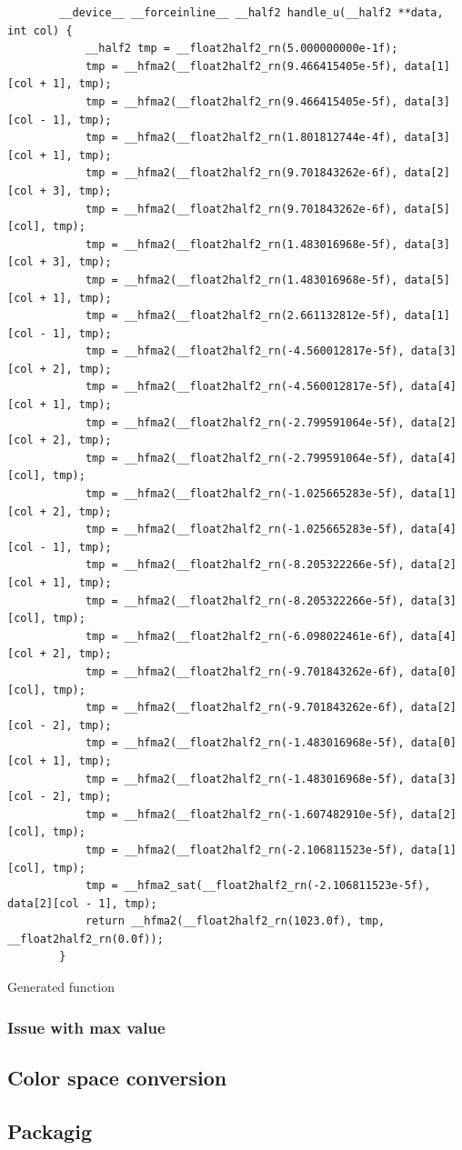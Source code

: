 \begin{listing}[H]
    \begin{verbatim}
        __device__ __forceinline__ __half2 handle_u(__half2 **data, int col) {
            __half2 tmp = __float2half2_rn(5.000000000e-1f);
            tmp = __hfma2(__float2half2_rn(9.466415405e-5f), data[1][col + 1], tmp);
            tmp = __hfma2(__float2half2_rn(9.466415405e-5f), data[3][col - 1], tmp);
            tmp = __hfma2(__float2half2_rn(1.801812744e-4f), data[3][col + 1], tmp);
            tmp = __hfma2(__float2half2_rn(9.701843262e-6f), data[2][col + 3], tmp);
            tmp = __hfma2(__float2half2_rn(9.701843262e-6f), data[5][col], tmp);
            tmp = __hfma2(__float2half2_rn(1.483016968e-5f), data[3][col + 3], tmp);
            tmp = __hfma2(__float2half2_rn(1.483016968e-5f), data[5][col + 1], tmp);
            tmp = __hfma2(__float2half2_rn(2.661132812e-5f), data[1][col - 1], tmp);
            tmp = __hfma2(__float2half2_rn(-4.560012817e-5f), data[3][col + 2], tmp);
            tmp = __hfma2(__float2half2_rn(-4.560012817e-5f), data[4][col + 1], tmp);
            tmp = __hfma2(__float2half2_rn(-2.799591064e-5f), data[2][col + 2], tmp);
            tmp = __hfma2(__float2half2_rn(-2.799591064e-5f), data[4][col], tmp);
            tmp = __hfma2(__float2half2_rn(-1.025665283e-5f), data[1][col + 2], tmp);
            tmp = __hfma2(__float2half2_rn(-1.025665283e-5f), data[4][col - 1], tmp);
            tmp = __hfma2(__float2half2_rn(-8.205322266e-5f), data[2][col + 1], tmp);
            tmp = __hfma2(__float2half2_rn(-8.205322266e-5f), data[3][col], tmp);
            tmp = __hfma2(__float2half2_rn(-6.098022461e-6f), data[4][col + 2], tmp);
            tmp = __hfma2(__float2half2_rn(-9.701843262e-6f), data[0][col], tmp);
            tmp = __hfma2(__float2half2_rn(-9.701843262e-6f), data[2][col - 2], tmp);
            tmp = __hfma2(__float2half2_rn(-1.483016968e-5f), data[0][col + 1], tmp);
            tmp = __hfma2(__float2half2_rn(-1.483016968e-5f), data[3][col - 2], tmp);
            tmp = __hfma2(__float2half2_rn(-1.607482910e-5f), data[2][col], tmp);
            tmp = __hfma2(__float2half2_rn(-2.106811523e-5f), data[1][col], tmp);
            tmp = __hfma2_sat(__float2half2_rn(-2.106811523e-5f), data[2][col - 1], tmp);
            return __hfma2(__float2half2_rn(1023.0f), tmp, __float2half2_rn(0.0f));
        }
      \end{verbatim}
    \caption{Generated function}
\end{listing}

\subsubsection{Issue with max value}
\subsection{Color space conversion}

\subsection{Packagig}